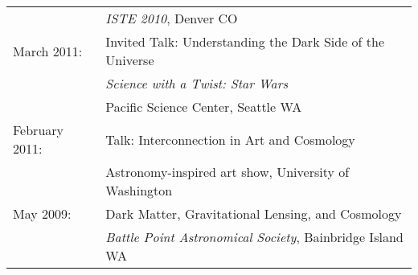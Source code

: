 {\begin{tabular}{ll}
                 & \hspace{1cm} {\it ISTE 2010}, Denver CO\\
  March 2011:    & Invited Talk: Understanding the Dark Side of the Universe\\
                 & \hspace{1cm} {\it Science with a Twist: Star Wars}\\
                 & \hspace{1cm} Pacific Science Center, Seattle WA\\
  February 2011: & Talk: Interconnection in Art and Cosmology\\
                 & \hspace{1cm} Astronomy-inspired art show,
                   University of Washington\\
  May 2009:      & Dark Matter, Gravitational Lensing, and Cosmology\\
                 & \hspace{1cm} {\it Battle Point Astronomical Society},
                   Bainbridge Island WA
\end{tabular}

}
